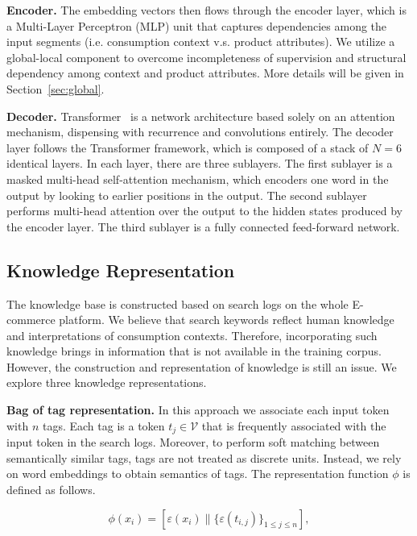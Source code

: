 \documentclass[sigconf]{acmart}
\begin{document}
\textbf{Encoder.}  The embedding vectors then flows through the encoder layer, which is a Multi-Layer Perceptron (MLP) unit that captures dependencies among the input segments (i.e. consumption context v.s. product attributes). We utilize a global-local component to overcome incompleteness of supervision and structural dependency among context and product attributes. More details will be given in Section~\ref{sec:global}.  


\textbf{Decoder.} Transformer~\cite{vaswani2017attention} is a network architecture based solely on an attention mechanism, dispensing with recurrence and convolutions entirely. The decoder layer follows the Transformer framework, which is composed of a stack of $N = 6$ identical layers. In each layer, there are three sublayers.  The first sublayer is a masked multi-head self-attention mechanism, which encoders one word in the output by looking to earlier positions in the output. The second sublayer performs multi-head attention over the output to the hidden states produced by the encoder layer.  The third sublayer is a fully connected feed-forward network.

\subsection{Knowledge Representation}\label{sec:knowledge}

The knowledge base is constructed based on search logs on the whole E-commerce platform. We believe that search keywords reflect human knowledge and interpretations of consumption contexts. Therefore, incorporating such knowledge brings in information that is not available in the training corpus. However, the construction and representation of knowledge is still an issue. We explore three knowledge representations.

\textbf{Bag of tag representation.} In this approach we associate each input token with $n$ tags. Each tag is a token $t_j\in\mathcal{V}$ that is frequently associated with the input token in the search logs. Moreover, to perform soft matching between semantically similar tags, tags are not treated as discrete units. Instead, we rely on word embeddings to obtain semantics of tags. The representation function $\phi$ is defined as follows.

\begin{equation}
\phi(x_i) = [\varepsilon (x_i)\|\{\varepsilon(t_{i,j})\}_{1\leq j \leq n}],
\end{equation}
\end{document}
